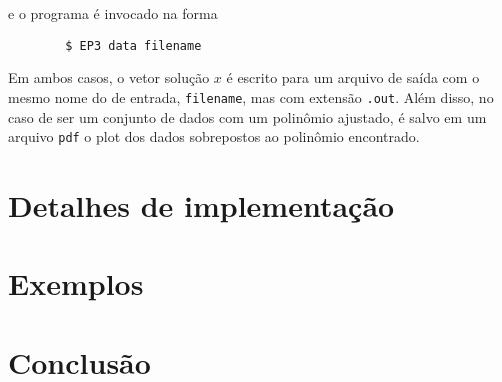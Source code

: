 \documentclass[a4paper,11pt]{article}
\begin{document}
        e o programa é invocado na forma

        \begin{lstlisting}
        $ EP3 data filename
        \end{lstlisting}


        Em ambos casos, o vetor solução $x$ é escrito para um arquivo de saída com o mesmo nome do de entrada, \texttt{filename}, mas com extensão \texttt{.out}.
        Além disso, no caso de ser um conjunto de dados com um polinômio ajustado, é salvo em um arquivo \texttt{pdf} o plot dos dados sobrepostos ao polinômio encontrado.

    \section*{Detalhes de implementação}
    \section*{Exemplos}
    \section*{Conclusão}
\end{document}
